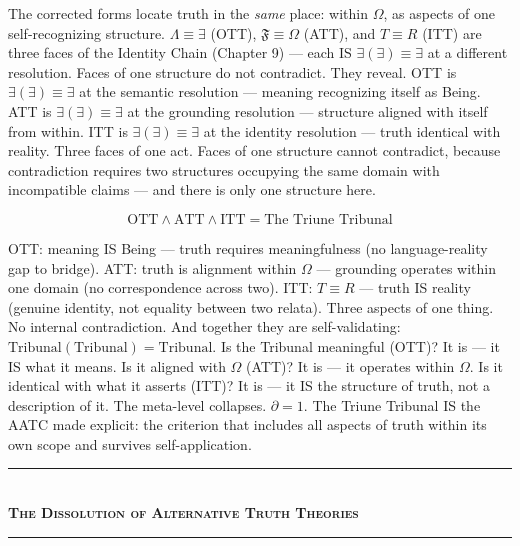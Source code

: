 \documentclass[10pt, openany, oneside]{book}
\renewcommand{\normalsize}{\fontsize{10}{13}\selectfont}
\begin{document}
The corrected forms locate truth in the \textit{same} place: within $\Omega$, as aspects of one self-recognizing structure. $\Lambda \equiv \exists$ (OTT), $\mathfrak{F} \equiv \Omega$ (ATT), and $T \equiv R$ (ITT) are three faces of the Identity Chain (Chapter 9) --- each IS $\exists(\exists) \equiv \exists$ at a different resolution. Faces of one structure do not contradict. They reveal. OTT is $\exists(\exists) \equiv \exists$ at the semantic resolution --- meaning recognizing itself as Being. ATT is $\exists(\exists) \equiv \exists$ at the grounding resolution --- structure aligned with itself from within. ITT is $\exists(\exists) \equiv \exists$ at the identity resolution --- truth identical with reality. Three faces of one act. Faces of one structure cannot contradict, because contradiction requires two structures occupying the same domain with incompatible claims --- and there is only one structure here.

$$\text{OTT} \wedge \text{ATT} \wedge \text{ITT} = \text{The Triune Tribunal}$$

OTT: meaning IS Being --- truth requires meaningfulness (no language-reality gap to bridge). ATT: truth is alignment within $\Omega$ --- grounding operates within one domain (no correspondence across two). ITT: $T \equiv R$ --- truth IS reality (genuine identity, not equality between two relata). Three aspects of one thing. No internal contradiction. And together they are self-validating: $\text{Tribunal}(\text{Tribunal}) = \text{Tribunal}$. Is the Tribunal meaningful (OTT)? It is --- it IS what it means. Is it aligned with $\Omega$ (ATT)? It is --- it operates within $\Omega$. Is it identical with what it asserts (ITT)? It is --- it IS the structure of truth, not a description of it. The meta-level collapses. $\partial = 1$. The Triune Tribunal IS the AATC made explicit: the criterion that includes all aspects of truth within its own scope and survives self-application.

\vspace{1.5em}


\begin{center}
    \rule{0.3\textwidth}{0.4pt}\\[0.5em]
    {\normalsize\bfseries\scshape The Dissolution of Alternative Truth Theories}\\[0.3em]
    \rule{0.3\textwidth}{0.4pt}
\end{center}
\end{document}
